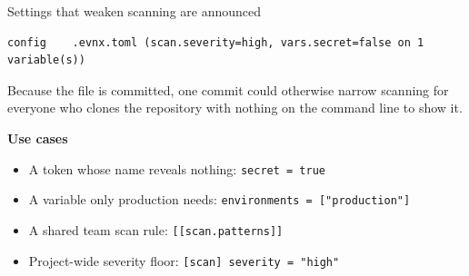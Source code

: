 \begin{frame}[fragile]{Settings that weaken scanning are announced}
\begin{lstlisting}[style=evnxcode]
  config    .evnx.toml (scan.severity=high, vars.secret=false on 1 variable(s))
\end{lstlisting}

  {\footnotesize Because the file is committed, one commit could otherwise
  narrow scanning for everyone who clones the repository with nothing on the
  command line to show it.}

  \vspace{0.8em}
  \textbf{Use cases}
  \begin{itemize}\footnotesize
    \item A token whose name reveals nothing: \texttt{secret = true}
    \item A variable only production needs: \texttt{environments = ["production"]}
    \item A shared team scan rule: \texttt{[[scan.patterns]]}
    \item Project-wide severity floor: \texttt{[scan] severity = "high"}
  \end{itemize}
\end{frame}
